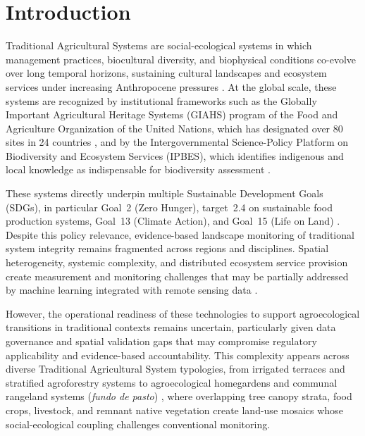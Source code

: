 \documentclass[lineno,pdflatex,sn-apa]{sn-jnl}
\begin{document}

\maketitle

\section{Introduction}

Traditional Agricultural Systems are social-ecological systems in which management practices, biocultural diversity, and biophysical conditions co-evolve over long temporal horizons, sustaining cultural landscapes and ecosystem services under increasing Anthropocene pressures \citep{Berkes2003}. At the global scale, these systems are recognized by institutional frameworks such as the Globally Important Agricultural Heritage Systems (GIAHS) program of the Food and Agriculture Organization of the United Nations, which has designated over 80 sites in 24 countries \citep{Koohafkan2011}, and by the Intergovernmental Science-Policy Platform on Biodiversity and Ecosystem Services (IPBES), which identifies indigenous and local knowledge as indispensable for biodiversity assessment \citep{IPBES2019}.

These systems directly underpin multiple Sustainable Development Goals (SDGs), in particular Goal~2 (Zero Hunger), target~2.4 on sustainable food production systems, Goal~13 (Climate Action), and Goal~15 (Life on Land) \citep{UN2015}. Despite this policy relevance, evidence-based landscape monitoring of traditional system integrity remains fragmented across regions and disciplines. Spatial heterogeneity, systemic complexity, and distributed ecosystem service provision create measurement and monitoring challenges that may be partially addressed by machine learning integrated with remote sensing data \citep{Weiss2020,Osco2021}.

However, the operational readiness of these technologies to support agroecological transitions in traditional contexts remains uncertain, particularly given data governance and spatial validation gaps that may compromise regulatory applicability and evidence-based accountability. This complexity appears across diverse Traditional Agricultural System typologies, from irrigated terraces and stratified agroforestry systems to agroecological homegardens and communal rangeland systems (\textit{fundo de pasto}) \citep{Koohafkan2011,Altieri2004}, where overlapping tree canopy strata, food crops, livestock, and remnant native vegetation create land-use mosaics whose social-ecological coupling challenges conventional monitoring.
\end{document}

